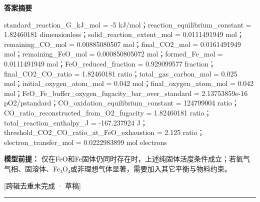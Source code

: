 \documentclass[UTF8,11pt,a4paper]{ctexart}
\begin{document}
\noindent\textbf{答案摘要}\par
standard\_reaction\_G\_kJ\_mol = -5 kJ/mol；reaction\_equilibrium\_constant = 1.82460181 dimensionless；solid\_reaction\_extent\_mol = 0.0111491949 mol；remaining\_CO\_mol = 0.00885080507 mol；final\_CO2\_mol = 0.0161491949 mol；remaining\_FeO\_mol = 0.000850805072 mol；formed\_Fe\_mol = 0.0111491949 mol；FeO\_reduced\_fraction = 0.929099577 fraction；final\_CO2\_CO\_ratio = 1.82460181 ratio；total\_gas\_carbon\_mol = 0.025 mol；initial\_oxygen\_atom\_mol = 0.042 mol；final\_oxygen\_atom\_mol = 0.042 mol；FeO\_Fe\_buffer\_oxygen\_fugacity\_bar\_over\_standard = 2.13753859e-16 pO2/pstandard；CO\_oxidation\_equilibrium\_constant = 124799004 ratio；CO\_ratio\_reconstructed\_from\_O2\_fugacity = 1.82460181 ratio；total\_reaction\_enthalpy\_J = -167.237924 J；threshold\_CO2\_CO\_ratio\_at\_FeO\_exhaustion = 2.125 ratio；electron\_transfer\_mol = 0.0222983899 mol electrons\par
\noindent\textbf{模型前提：}
仅在FeO和Fe固体仍同时存在时，上述纯固体活度条件成立；若氧气气相、固溶体、Fe₃O₄或非理想气体显著，需要加入其它平衡与物料约束。\par
\noindent\textcolor{red!65!black}{[跨辑去重未完成 · 草稿]} \par
\medskip\hrule\medskip
{}
\end{document}
